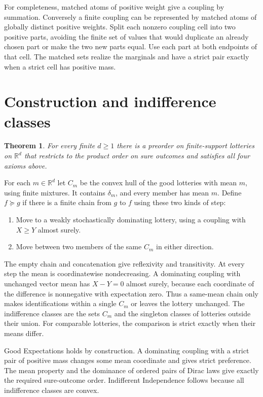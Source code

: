 \documentclass[11pt,a4paper]{amsart}
\newtheorem{theorem}{Theorem}
\newcommand{\R}{\mathbb R}
\begin{document}
For completeness, matched atoms of positive weight give a coupling by summation. Conversely a finite coupling can be represented by matched atoms of globally distinct positive weights. Split each nonzero coupling cell into two positive parts, avoiding the finite set of values that would duplicate an already chosen part or make the two new parts equal. Use each part at both endpoints of that cell. The matched sets realize the marginals and have a strict pair exactly when a strict cell has positive mass.

\section{Construction and indifference classes}
\begin{theorem}
For every finite $d\ge1$ there is a preorder on finite-support lotteries on $\R^d$ that restricts to the product order on sure outcomes and satisfies all four axioms above.
\end{theorem}

For each $m\in\R^d$ let $C_m$ be the convex hull of the good lotteries with mean $m$, using finite mixtures. It contains $\delta_m$, and every member has mean $m$. Define $f\succeq g$ if there is a finite chain from $g$ to $f$ using these two kinds of step:
\begin{enumerate}
\item Move to a weakly stochastically dominating lottery, using a coupling with $X\ge Y$ almost surely.
\item Move between two members of the same $C_m$ in either direction.
\end{enumerate}
The empty chain and concatenation give reflexivity and transitivity. At every step the mean is coordinatewise nondecreasing. A dominating coupling with unchanged vector mean has $X-Y=0$ almost surely, because each coordinate of the difference is nonnegative with expectation zero. Thus a same-mean chain only makes identifications within a single $C_m$ or leaves the lottery unchanged. The indifference classes are the sets $C_m$ and the singleton classes of lotteries outside their union. For comparable lotteries, the comparison is strict exactly when their means differ.

Good Expectations holds by construction. A dominating coupling with a strict pair of positive mass changes some mean coordinate and gives strict preference. The mean property and the dominance of ordered pairs of Dirac laws give exactly the required sure-outcome order. Indifferent Independence follows because all indifference classes are convex.
\end{document}
